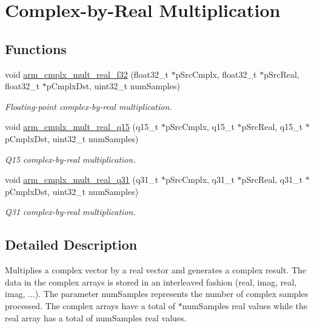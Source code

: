 \hypertarget{group___cmplx_by_real_mult}{\section{Complex-\/by-\/\-Real Multiplication}
\label{group___cmplx_by_real_mult}
}
\subsection*{Functions}
\begin{DoxyCompactItemize}
\item 
void \hyperlink{group___cmplx_by_real_mult_ga9c18616f56cb4d3c0889ce0b339221ca}{arm\-\_\-cmplx\-\_\-mult\-\_\-real\-\_\-f32} (float32\-\_\-t $\ast$p\-Src\-Cmplx, float32\-\_\-t $\ast$p\-Src\-Real, float32\-\_\-t $\ast$p\-Cmplx\-Dst, uint32\-\_\-t num\-Samples)
\begin{DoxyCompactList}\small\item\em Floating-\/point complex-\/by-\/real multiplication. \end{DoxyCompactList}\item 
void \hyperlink{group___cmplx_by_real_mult_ga3bd8889dcb45980e1d3e53344df54e85}{arm\-\_\-cmplx\-\_\-mult\-\_\-real\-\_\-q15} (q15\-\_\-t $\ast$p\-Src\-Cmplx, q15\-\_\-t $\ast$p\-Src\-Real, q15\-\_\-t $\ast$p\-Cmplx\-Dst, uint32\-\_\-t num\-Samples)
\begin{DoxyCompactList}\small\item\em Q15 complex-\/by-\/real multiplication. \end{DoxyCompactList}\item 
void \hyperlink{group___cmplx_by_real_mult_ga715e4bb8e945b8ca51ec5237611697ce}{arm\-\_\-cmplx\-\_\-mult\-\_\-real\-\_\-q31} (q31\-\_\-t $\ast$p\-Src\-Cmplx, q31\-\_\-t $\ast$p\-Src\-Real, q31\-\_\-t $\ast$p\-Cmplx\-Dst, uint32\-\_\-t num\-Samples)
\begin{DoxyCompactList}\small\item\em Q31 complex-\/by-\/real multiplication. \end{DoxyCompactList}\end{DoxyCompactItemize}


\subsection{Detailed Description}
Multiplies a complex vector by a real vector and generates a complex result. The data in the complex arrays is stored in an interleaved fashion (real, imag, real, imag, ...). The parameter {\ttfamily num\-Samples} represents the number of complex samples processed. The complex arrays have a total of {$\ast$num\-Samples} real values while the real array has a total of {\ttfamily num\-Samples} real values.

